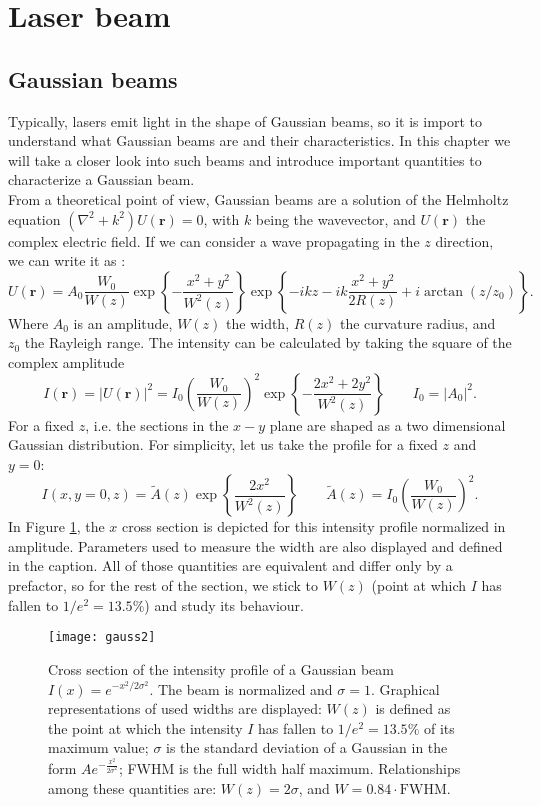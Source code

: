 \section{Laser beam}
\subsection{Gaussian beams}
\label{sec_diffraction}
Typically, lasers emit light in the shape of Gaussian beams, so it is import to understand what Gaussian beams are and their characteristics. In this chapter we will take a closer look into such beams and introduce important quantities to characterize a Gaussian beam. \\
From a theoretical point of view, Gaussian beams are a solution of the Helmholtz equation $(\nabla^2 + k^2)U(\mathbf{r}) = 0$, with $k$ being the wavevector, and $U(\mathbf{r})$ the complex electric field. If we can consider a wave propagating in the $z$ direction, we can write it as \cite{saleh}:
\begin{equation}
\label{gaussianbeams}
U(\mathbf{r}) = A_0 \frac{W_0}{W(z)}\exp\left\{-\frac{x^2+y^2}{W^2(z)}\right\}\exp\left\{-ikz-ik\frac{x^2+y^2}{2R(z)}+i\arctan(z/z_0)\right\}.
\end{equation}
Where $A_0$ is an amplitude, $W(z)$ the width, $R(z)$ the curvature radius, and $z_0$ the Rayleigh range. The intensity can be calculated by taking the square of the complex amplitude
\begin{equation}
\label{beamintensity}
I(\mathbf{r}) = |U(\mathbf{r})|^2 = I_0 \left(\frac{W_0}{W(z)}\right)^2 \exp\left\{-\frac{2x^2 + 2y^2}{W^2(z)}\right\}  \qquad I_0 = |A_0|^2.
\end{equation}
For a fixed $z$, i.e. the sections in the $x-y$ plane are shaped as a two dimensional Gaussian distribution. For simplicity, let us take the profile for a fixed $z$ and $y=0$:
\begin{equation}
I(x,y=0,z) = \widetilde{A}(z) \exp\left\{\frac{2x^2}{W^2(z)}\right\} \qquad \widetilde{A}(z) = I_0 \left(\frac{W_0}{W(z)}\right)^2  .
\end{equation}
In Figure \ref{gauss}, the $x$ cross section is depicted for this intensity profile normalized in amplitude. Parameters used to measure the width are also displayed and defined in the caption. All of those quantities are equivalent and differ only by a prefactor, so for the rest of the section, we stick to $W(z)$ (point at which $I$ has fallen to $1/e^2 = 13.5\%$) and study its behaviour.
\begin{figure}
\centering
\texttt{[image: gauss2]}
\caption{Cross section of the intensity profile of a Gaussian beam $I(x) = e^{-x^2/2\sigma^2}$. The beam is normalized and $\sigma=1$. Graphical representations of used widths are displayed: $W(z)$ is defined as the point at which the intensity $I$ has fallen to $1/e^2 = 13.5\%$ of its maximum value; $\sigma$ is the standard deviation of a Gaussian in the form $Ae^{-\frac{x^2}{2\sigma^2}}$; FWHM is the full width half maximum. Relationships among these quantities are: $W(z) = 2\sigma$, and $W = 0.84\cdot \text{FWHM}$.}
\label{gauss}
\end{figure}
